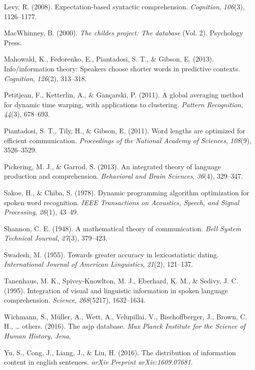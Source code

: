\documentclass[10pt, letterpaper]{article}
\begin{document}
\leavevmode\hypertarget{ref-levy2008}{}%
Levy, R. (2008). Expectation-based syntactic comprehension.
\emph{Cognition}, \emph{106}(3), 1126--1177.

\leavevmode\hypertarget{ref-macwhinney2000}{}%
MacWhinney, B. (2000). \emph{The childes project: The database} (Vol.
2). Psychology Press.

\leavevmode\hypertarget{ref-mahowald2013}{}%
Mahowald, K., Fedorenko, E., Piantadosi, S. T., \& Gibson, E. (2013).
Info/information theory: Speakers choose shorter words in predictive
contexts. \emph{Cognition}, \emph{126}(2), 313--318.

\leavevmode\hypertarget{ref-petitjean2011}{}%
Petitjean, F., Ketterlin, A., \& Gançarski, P. (2011). A global
averaging method for dynamic time warping, with applications to
clustering. \emph{Pattern Recognition}, \emph{44}(3), 678--693.

\leavevmode\hypertarget{ref-piantadosi2011}{}%
Piantadosi, S. T., Tily, H., \& Gibson, E. (2011). Word lengths are
optimized for efficient communication. \emph{Proceedings of the National
Academy of Sciences}, \emph{108}(9), 3526--3529.

\leavevmode\hypertarget{ref-pickering2013}{}%
Pickering, M. J., \& Garrod, S. (2013). An integrated theory of language
production and comprehension. \emph{Behavioral and Brain Sciences},
\emph{36}(4), 329--347.

\leavevmode\hypertarget{ref-sakoe1978}{}%
Sakoe, H., \& Chiba, S. (1978). Dynamic programming algorithm
optimization for spoken word recognition. \emph{IEEE Transactions on
Acoustics, Speech, and Signal Processing}, \emph{26}(1), 43--49.

\leavevmode\hypertarget{ref-shannon1948}{}%
Shannon, C. E. (1948). A mathematical theory of communication.
\emph{Bell System Technical Journal}, \emph{27}(3), 379--423.

\leavevmode\hypertarget{ref-swadesh1955}{}%
Swadesh, M. (1955). Towards greater accuracy in lexicostatistic dating.
\emph{International Journal of American Linguistics}, \emph{21}(2),
121--137.

\leavevmode\hypertarget{ref-tanenhaus1995}{}%
Tanenhaus, M. K., Spivey-Knowlton, M. J., Eberhard, K. M., \& Sedivy, J.
C. (1995). Integration of visual and linguistic information in spoken
language comprehension. \emph{Science}, \emph{268}(5217), 1632--1634.

\leavevmode\hypertarget{ref-wichmann2016}{}%
Wichmann, S., Müller, A., Wett, A., Velupillai, V., Bischoffberger, J.,
Brown, C. H., \ldots{} others. (2016). The asjp database. \emph{Max
Planck Institute for the Science of Human History, Jena}.

\leavevmode\hypertarget{ref-yu2016}{}%
Yu, S., Cong, J., Liang, J., \& Liu, H. (2016). The distribution of
information content in english sentences. \emph{arXiv Preprint
arXiv:1609.07681}.


\end{document}
